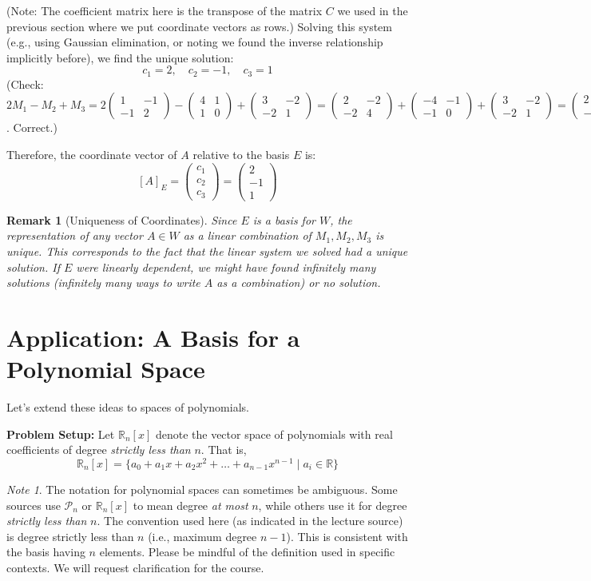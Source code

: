 \documentclass[11pt]{article}
\newtheorem{remark}[theorem]{Remark}
\theoremstyle{definition}
\theoremstyle{remark}
\newtheorem*{note}{Note}
\newcommand{\R}{\mathbb{R}}
\newcommand{\mat}[1]{\begin{pmatrix}#1\end{pmatrix}}
\begin{document}
\begin{itemize}
        (Note: The coefficient matrix here is the transpose of the matrix $C$ we used in the previous section where we put coordinate vectors as rows.)
        Solving this system (e.g., using Gaussian elimination, or noting we found the inverse relationship implicitly before), we find the unique solution:
        \[ c_1 = 2, \quad c_2 = -1, \quad c_3 = 1 \]
        (Check: $2M_1 - M_2 + M_3 = 2\mat{1 & -1 \\ -1 & 2} - \mat{4 & 1 \\ 1 & 0} + \mat{3 & -2 \\ -2 & 1} = \mat{2 & -2 \\ -2 & 4} + \mat{-4 & -1 \\ -1 & 0} + \mat{3 & -2 \\ -2 & 1} = \mat{2-4+3 & -2-1-2 \\ -2-1-2 & 4+0+1} = \mat{1 & -5 \\ -5 & 5} = A$. Correct.)

        Therefore, the coordinate vector of $A$ relative to the basis $E$ is:
        \[ [A]_E = \mat{c_1 \\ c_2 \\ c_3} = \mat{2 \\ -1 \\ 1} \]
\end{itemize}

\begin{remark}[Uniqueness of Coordinates]
Since $E$ is a basis for $W$, the representation of any vector $A \in W$ as a linear combination of $M_1, M_2, M_3$ is unique. This corresponds to the fact that the linear system we solved had a unique solution. If $E$ were linearly dependent, we might have found infinitely many solutions (infinitely many ways to write $A$ as a combination) or no solution.
\end{remark}

\section{Application: A Basis for a Polynomial Space} \label{sec:polynomials}

Let's extend these ideas to spaces of polynomials.

\textbf{Problem Setup:}
Let $\R_n[x]$ denote the vector space of polynomials with real coefficients of degree \emph{strictly less than} $n$. That is,
\[ \R_n[x] = \{ a_0 + a_1 x + a_2 x^2 + \dots + a_{n-1} x^{n-1} \mid a_i \in \R \} \]
\begin{note}
The notation for polynomial spaces can sometimes be ambiguous. Some sources use $\mathcal{P}_n$ or $\R_n[x]$ to mean degree \emph{at most} $n$, while others use it for degree \emph{strictly less than} $n$. The convention used here (as indicated in the lecture source) is degree strictly less than $n$ (i.e., maximum degree $n-1$). This is consistent with the basis having $n$ elements. Please be mindful of the definition used in specific contexts. We will request clarification for the course.
\end{note}
\end{document}
